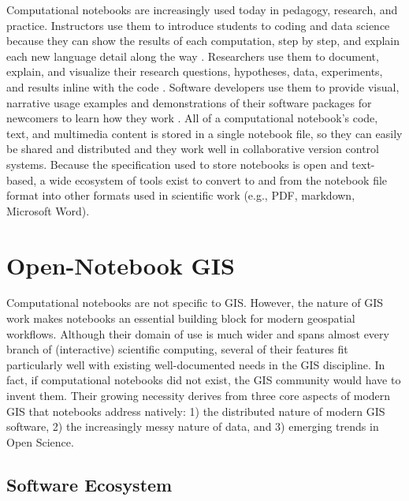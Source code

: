 \documentclass[11pt,letterpaper]{article}
\begin{document}
Computational notebooks are increasingly used today in pedagogy, research, and practice. Instructors use them to introduce students to coding and data science because they can show the results of each computation, step by step, and explain each new language detail along the way \citep{reades_teaching_2020}. Researchers use them to document, explain, and visualize their research questions, hypotheses, data, experiments, and results inline with the code \citep{perkel_why_2018}. Software developers use them to provide visual, narrative usage examples and demonstrations of their software packages for newcomers to learn how they work \citep{boeing_urban_2020}. All of a computational notebook's code, text, and multimedia content is stored in a single notebook file, so they can easily be shared and distributed and they work well in collaborative version control systems. Because the specification used to store notebooks is open and text-based, a wide ecosystem of tools exist to convert to and from the notebook file format into other formats used in scientific work (e.g., PDF, markdown, Microsoft Word).

\section{Open-Notebook GIS}

Computational notebooks are not specific to GIS. However, the nature of GIS work makes notebooks an essential building block for modern geospatial workflows. Although their domain of use is much wider and spans almost every branch of (interactive) scientific computing, several of their features fit particularly well with existing well-documented needs in the GIS discipline. In fact, if computational notebooks did not exist, the GIS community would have to invent them. Their growing necessity derives from three core aspects of modern GIS that notebooks address natively: 1) the distributed nature of modern GIS software, 2) the increasingly messy nature of data, and 3) emerging trends in Open Science.

\subsection{Software Ecosystem}
\end{document}
